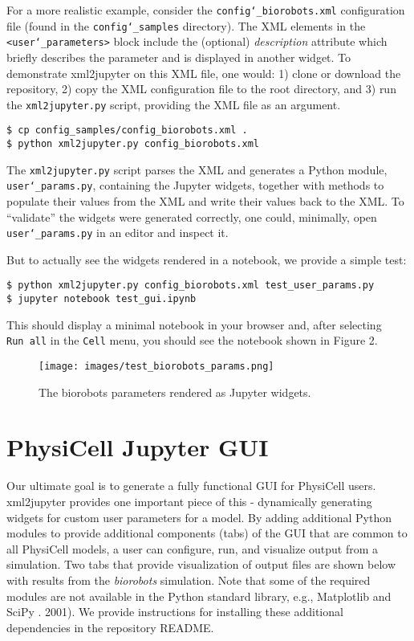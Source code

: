 \documentclass[10pt,letterpaper]{article}
\begin{document}
For a more realistic example, consider the
\texttt{config\char`_biorobots.xml} configuration file (found in the
\texttt{config\char`_samples} directory). The XML elements in the
\texttt{\textless{}user\char`_parameters\textgreater{}} block include the
(optional) \emph{description} attribute which briefly describes the
parameter and is displayed in another widget. To demonstrate xml2jupyter
on this XML file, one would: 1) clone or download the repository, 2)
copy the XML configuration file to the root directory, and 3) run the
\texttt{xml2jupyter.py} script, providing the XML file as an argument.

\begin{verbatim}
$ cp config_samples/config_biorobots.xml .
$ python xml2jupyter.py config_biorobots.xml 
\end{verbatim}

\begin{sloppypar}
The \texttt{xml2jupyter.py} script parses the XML and generates a Python
module, 
\texttt{user\char`_params.py}, 
containing the Jupyter widgets,
together with methods to populate their values from the XML and write
their values back to the XML. To ``validate'' the widgets were generated
correctly, one could, minimally, open \texttt{user\char`_params.py} in an
editor and inspect it.
\end{sloppypar}

But to actually see the widgets rendered in a notebook, we provide a
simple test:

\begin{verbatim}
$ python xml2jupyter.py config_biorobots.xml test_user_params.py
$ jupyter notebook test_gui.ipynb
\end{verbatim}

This should display a minimal notebook in your browser and, after
selecting \texttt{Run\ all} in the \texttt{Cell} menu, you should see
the notebook shown in Figure 2.

\begin{figure}
\centering
\texttt{[image: images/test\_biorobots\_params.png]}
\caption{The biorobots parameters rendered as Jupyter widgets.}
\end{figure}

\section*{PhysiCell Jupyter GUI}

Our ultimate goal is to generate a fully functional GUI for PhysiCell
users. xml2jupyter provides one important piece of this - dynamically
generating widgets for custom user parameters for a model. By adding
additional Python modules to provide additional components (tabs) of the
GUI that are common to all PhysiCell models, a user can configure, run,
and visualize output from a simulation. Two tabs that provide
visualization of output files are shown below with results from the
\emph{biorobots} simulation. Note that some of the required modules are
not available in the Python standard library, e.g., Matplotlib \cite{Hunter:2007}
and SciPy \cite{Jones:2001}. 2001). We provide instructions for
installing these additional dependencies in the repository README.
\end{document}
